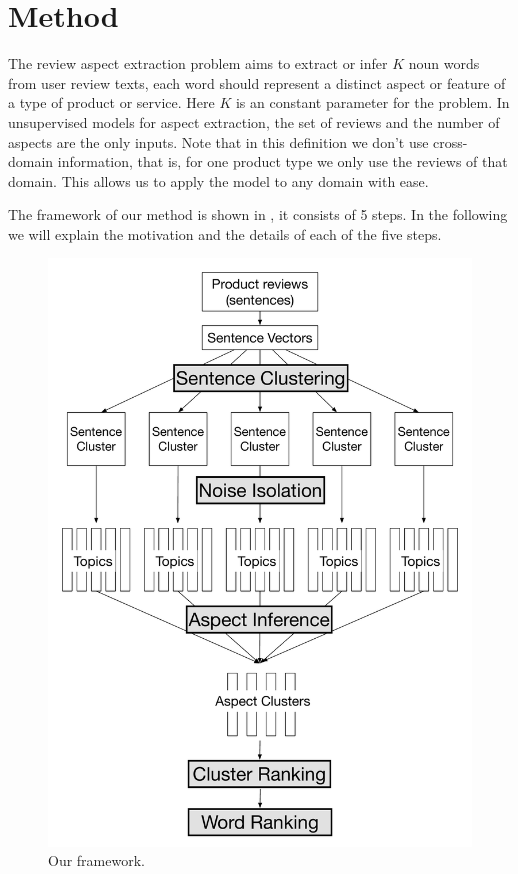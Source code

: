 \section{Method}
\label{sec:method}

The review aspect extraction problem aims to extract or infer $K$ noun 
words from user review texts,
each word should represent a distinct aspect or feature of a type of product or service. 
Here $K$ is an constant parameter for the problem. 
In unsupervised models for aspect extraction, 
the set of reviews and the number of aspects are the only inputs.
Note that in this definition we don't use cross-domain information, 
that is, for one product type we only use the reviews of that domain.
This allows us to apply the model to any domain with ease.

The framework of our method is shown in , 
it consists of 5 steps. 
In the following we will explain the motivation and the details of each of
the five steps.

\begin{figure}[th]
\centering
\includegraphics[width=0.9\columnwidth]{figures/framework}
\caption{Our framework.}
\label{fig:framework}
\end{figure}

